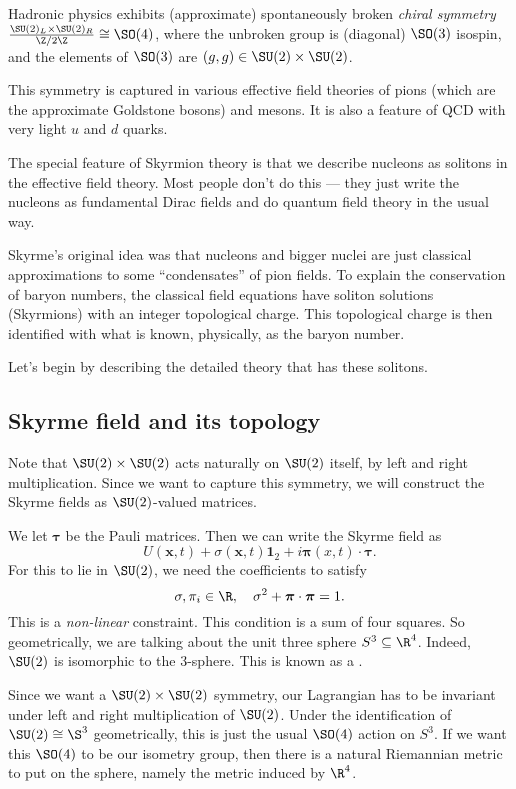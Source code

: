\documentclass[a4paper]{article}
\begin{document}
Hadronic physics exhibits (approximate) spontaneously broken \emph{chiral symmetry} $\frac{\SU(2)_L \times \SU(2)_R}{\Z/2\Z} \cong \SO(4)$, where the unbroken group is (diagonal) $\SO(3)$ isospin, and the elements of $\SO(3)$ are $(g, g) \in \SU(2) \times \SU(2)$.

This symmetry is captured in various effective field theories of pions (which are the approximate Goldstone bosons) and mesons. It is also a feature of QCD with very light $u$ and $d$ quarks.

The special feature of Skyrmion theory is that we describe nucleons as solitons in the effective field theory. Most people don't do this --- they just write the nucleons as fundamental Dirac fields and do quantum field theory in the usual way.

Skyrme's original idea was that nucleons and bigger nuclei are just classical approximations to some ``condensates'' of pion fields. To explain the conservation  of baryon numbers, the classical field equations have soliton solutions (Skyrmions) with an integer topological charge. This topological charge is then identified with what is known, physically, as the baryon number.

Let's begin by describing the detailed theory that has these solitons.
\subsection{Skyrme field and its topology}
Note that $\SU(2) \times \SU(2)$ acts naturally on $\SU(2)$ itself, by left and right multiplication. Since we want to capture this symmetry, we will construct the Skyrme fields as $\SU(2)$-valued matrices.

We let $\boldsymbol\tau$ be the Pauli matrices. Then we can write the Skyrme field as
\[
  U(\mathbf{x}, t) + \sigma(\mathbf{x}, t) \mathbf{1}_2 + i \boldsymbol\pi(x, t) \cdot \boldsymbol\tau.
\]
For this to lie in $\SU(2)$, we need the coefficients to satisfy
\[
  \sigma, \pi_i \in \R,\quad \sigma^2 + \boldsymbol\pi \cdot \boldsymbol\pi = 1.
\]
This is a \emph{non-linear} constraint. This condition is a sum of four squares. So geometrically, we are talking about the unit three sphere $S^3 \subseteq \R^4$. Indeed, $\SU(2)$ is isomorphic to the $3$-sphere. This is known as a .

Since we want a $\SU(2) \times \SU(2)$ symmetry, our Lagrangian has to be invariant under left and right multiplication of $\SU(2)$. Under the identification of $\SU(2) \cong \S^3$ geometrically, this is just the usual $\SO(4)$ action on $S^3$. If we want this $\SO(4)$ to be our isometry group, then there is a natural Riemannian metric to put on the sphere, namely the metric induced by $\R^4$.
\end{document}
